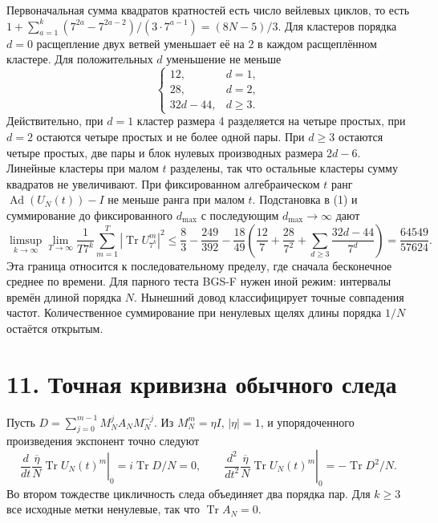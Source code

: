 \documentclass[11pt,a4paper]{article}
\newcommand{\Tr}{\operatorname{Tr}}
\newcommand{\sect}[1]{\section*{\sffamily\color{ink}#1}}
\newcommand{\Ad}{\operatorname{Ad}}
\begin{document}
Первоначальная сумма квадратов кратностей есть число вейлевых циклов, то есть \(1+\sum_{a=1}^k(7^{2a}-7^{2a-2})/(3\cdot 7^{a-1})=(8N-5)/3\). Для кластеров порядка \(d=0\) расщепление двух ветвей уменьшает её на 2 в каждом расщеплённом кластере. Для положительных \(d\) уменьшение не меньше
\[
 \begin{cases}
 12,&d=1,\\
 28,&d=2,\\
 32d-44,&d\ge3.
 \end{cases}
\]
Действительно, при \(d=1\) кластер размера 4 разделяется на четыре простых, при \(d=2\) остаются четыре простых и не более одной пары. При \(d\ge3\) остаются четыре простых, две пары и блок нулевых производных размера \(2d-6\). Линейные кластеры при малом \(t\) разделены, так что остальные кластеры сумму квадратов не увеличивают. При фиксированном алгебраическом \(t\) ранг \(\Ad(U_N(t))-I\) не меньше ранга при малом \(t\). Подстановка в (1) и суммирование до фиксированного \(d_{\max}\) с последующим \(d_{\max}\to\infty\) дают
\[
 \limsup_{k\to\infty}\lim_{T\to\infty}
     \frac1{T7^k}\sum_{m=1}^T|\Tr U_{7^k}^m|^2
 \le \frac83-\frac{249}{392}
  -\frac{18}{{49}}\left(\frac{12}{7}+\frac{28}{7^2}
                    +\sum_{d\ge3}\frac{32d-44}{7^d}\right)
 =\frac{64549}{57624}.
\]
Эта граница относится к последовательному пределу, где сначала бесконечное среднее по времени. Для парного теста BGS-F нужен иной режим: интервалы времён длиной порядка \(N\). Нынешний довод классифицирует точные совпадения частот. Количественное суммирование при ненулевых щелях длины порядка \(1/N\) остаётся открытым.
\newpage
\sect{11. Точная кривизна обычного следа}

Пусть \(D=\sum_{j=0}^{m-1}M_N^j A_N M_N^{-j}\). Из \(M_N^m=\eta I\), \(|\eta|=1\), и упорядоченного произведения экспонент точно следуют
\[
 \left.\frac{d}{dt}\frac{\overline\eta}{N}\Tr U_N(t)^m\right|_{0}
       =i\Tr D/N=0,\qquad
 \left.\frac{d^2}{dt^2}\frac{\overline\eta}{N}\Tr U_N(t)^m\right|_{0}
       =-\Tr D^2/N .
\]
Во втором тождестве цикличность следа объединяет два порядка пар. Для \(k\ge3\) все исходные метки ненулевые, так что \(\Tr A_N=0\).
\end{document}
